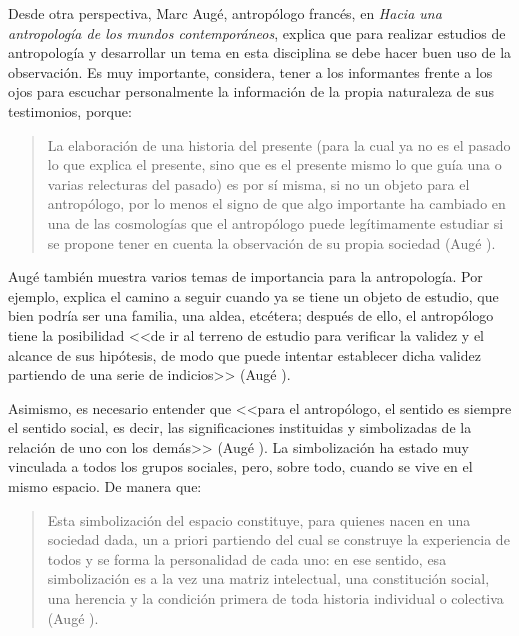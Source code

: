\documentclass[14pt,letterpaper,twoside]{extbook} %
\begin{document}
\noindent Desde otra perspectiva, Marc Augé, antropólogo francés, en \textit{Hacia una antropología de los mundos contemporáneos}, explica que para realizar estudios de antropología y desarrollar un tema en esta disciplina se debe hacer buen uso de la observación. Es muy importante, considera, tener a los informantes frente a los ojos para escuchar personalmente la información de la propia naturaleza de sus testimonios, porque:

\begin{quotation}
\noindent La elaboración de una historia del presente (para la cual ya no es el pasado lo que explica el presente, sino que es el presente mismo lo que guía una o varias relecturas del pasado) es por sí misma, si no un objeto para el antropólogo, por lo menos el signo de que algo importante ha cambiado en una de las cosmologías que el antropólogo puede legítimamente estudiar si se propone tener en cuenta la observación de su propia sociedad (Augé ).
\end{quotation}

\noindent Augé también muestra varios temas de importancia para la antropología. Por ejemplo, explica el camino a seguir cuando ya se tiene un objeto de estudio, que bien podría ser una familia, una aldea, etcétera; después de ello, el antropólogo tiene la posibilidad <<de ir al terreno de estudio para verificar la validez y el alcance de sus hipótesis, de modo que puede intentar establecer dicha validez partiendo de una serie de indicios>> (Augé ).

Asimismo, es necesario entender que <<para el antropólogo, el sentido es siempre el sentido social, es decir, las significaciones instituidas y simbolizadas de la relación de uno con los demás>> (Augé ). La simbolización ha estado muy vinculada a todos los grupos sociales, pero, sobre todo, cuando se vive en el mismo espacio. De manera que:

\begin{quotation}
\noindent Esta simbolización del espacio constituye, para quienes nacen en una sociedad dada, un a priori partiendo del cual se construye la experiencia de todos y se forma la personalidad de cada uno: en ese sentido, esa simbolización es a la vez una matriz intelectual, una constitución social, una herencia y la condición primera de toda historia individual o colectiva (Augé ).
\end{quotation}
\end{document}
